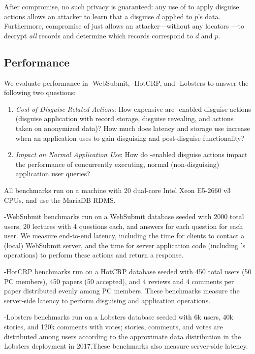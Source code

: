 After compromise, no such privacy is guaranteed: any use of  to apply disguise actions
allows an attacker to learn that a disguise $d$ applied to $p$'s data. Furthermore,
compromise of just  allows an attacker---without any locators ---to decrypt \emph{all} records and
determine which records correspond to $d$ and $p$.

\subsection{Performance}

We evaluate performance in \sys-WebSubmit, \sys-HotCRP, and \sys-Lobsters to answer the
following two questions:
\begin{enumerate}
\item \emph{Cost of Disguise-Related Actions}: How expensive are \sys-enabled disguise actions
(disguise application with record storage, disguise revealing, and actions taken on anonymized data)?
How much does latency and storage use increase when an application uses \sys to gain disguising and post-disguise functionality?
\item \emph{Impact on Normal Application Use}: How do \sys-enabled disguise actions impact the
    performance of concurrently executing, normal (non-disguising) application user queries?
\end{enumerate}

All benchmarks run on a machine with 20 dual-core Intel Xeon E5-2660 v3 CPUs, and use the MariaDB
RDMS.

\sys-WebSubmit benchmarks run on a WebSubmit database seeded with 2000 total users, 20
lectures with 4 questions each, and answers for each question for each user.  We measure end-to-end
latency, including the time for clients to contact a (local) WebSubmit server, and the time for
server application code (including \sys's operations) to perform these actions and return a
response.

\sys-HotCRP benchmarks run on a HotCRP database seeded with 450 total users (50 PC members),
450 papers (50 accepted), and 4 reviews and 4 comments per paper distributed evenly among PC
members. These benchmarks measure the server-side latency to perform disguising and application
operations.

\sys-Lobsters benchmarks run on a Lobsters database seeded with 6k users, 40k stories, and 120k
comments with votes; stories, comments, and votes are distributed among users according to the
approximate data distribution in the Lobsters deployment in 2017.These benchmarks also
measure server-side latency.

